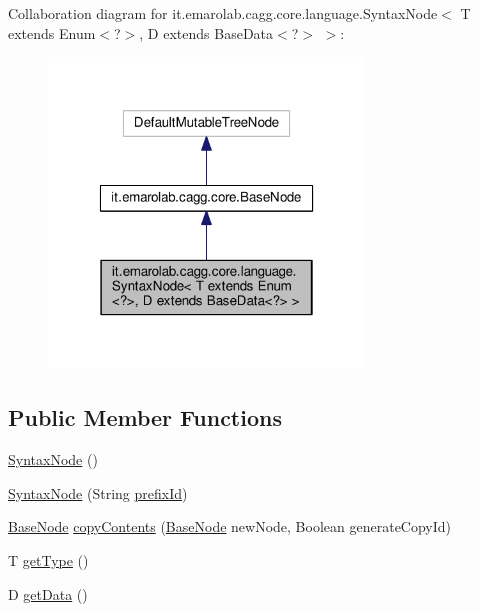 Collaboration diagram for it.\-emarolab.\-cagg.\-core.\-language.\-Syntax\-Node$<$ T extends Enum$<$?$>$, D extends Base\-Data$<$?$>$ $>$\-:\nopagebreak
\begin{figure}[H]
\begin{center}
\leavevmode
\includegraphics[width=238pt]{classit_1_1emarolab_1_1cagg_1_1core_1_1language_1_1SyntaxNode_3_01T_01extends_01Enum_3_04_4_00_0666823fcadeba0b6e745e04eb09af656}
\end{center}
\end{figure}
\subsection*{Public Member Functions}
\begin{DoxyCompactItemize}
\item 
\hyperlink{classit_1_1emarolab_1_1cagg_1_1core_1_1language_1_1SyntaxNode_3_01T_01extends_01Enum_3_04_4_00_0ad1119718731d7a79caa8c8c39688664_af1a789a6cb123a51aefa39eae38d021d}{Syntax\-Node} ()
\item 
\hyperlink{classit_1_1emarolab_1_1cagg_1_1core_1_1language_1_1SyntaxNode_3_01T_01extends_01Enum_3_04_4_00_0ad1119718731d7a79caa8c8c39688664_a1280397082fbf45597ffcdb54befdfe2}{Syntax\-Node} (String \hyperlink{classit_1_1emarolab_1_1cagg_1_1core_1_1BaseNode_a1e4662066a1e580f3ef9a1ad7c483dd8}{prefix\-Id})
\item 
\hyperlink{classit_1_1emarolab_1_1cagg_1_1core_1_1BaseNode}{Base\-Node} \hyperlink{classit_1_1emarolab_1_1cagg_1_1core_1_1language_1_1SyntaxNode_3_01T_01extends_01Enum_3_04_4_00_0ad1119718731d7a79caa8c8c39688664_adae449e7c57a9980506e60364c490961}{copy\-Contents} (\hyperlink{classit_1_1emarolab_1_1cagg_1_1core_1_1BaseNode}{Base\-Node} new\-Node, Boolean generate\-Copy\-Id)
\item 
T \hyperlink{classit_1_1emarolab_1_1cagg_1_1core_1_1language_1_1SyntaxNode_3_01T_01extends_01Enum_3_04_4_00_0ad1119718731d7a79caa8c8c39688664_a8b695dcbb42ba5e97e6cc27a3421e266}{get\-Type} ()
\item 
D \hyperlink{classit_1_1emarolab_1_1cagg_1_1core_1_1language_1_1SyntaxNode_3_01T_01extends_01Enum_3_04_4_00_0ad1119718731d7a79caa8c8c39688664_a93a1c238906e292a436711cb7f4dc482}{get\-Data} ()
\end{DoxyCompactItemize}
